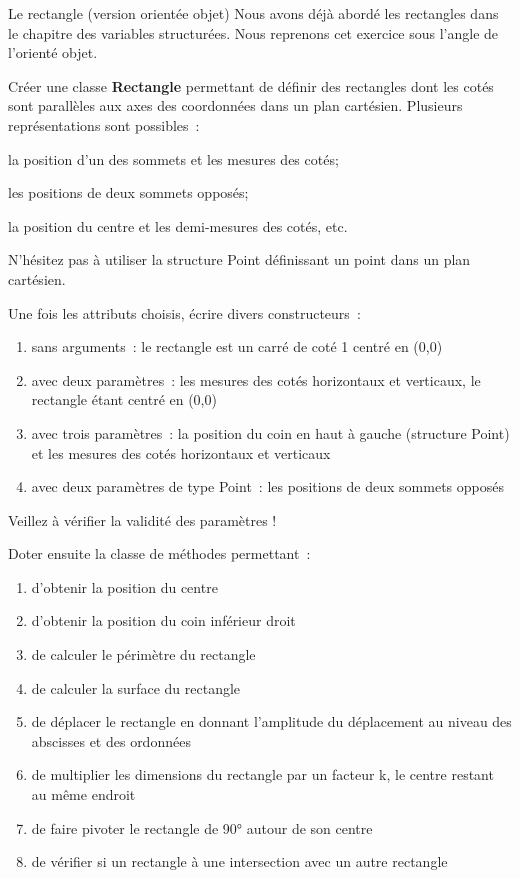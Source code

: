 \begin{Exercice}{Le rectangle (version orientée objet)}
	Nous avons déjà abordé les rectangles dans le chapitre des variables
	structurées. Nous reprenons cet exercice sous l’angle de l’orienté
	objet.

	Créer une classe \textbf{Rectangle}
	permettant de définir des rectangles dont les cotés sont parallèles aux
	axes des coordonnées dans un plan cartésien. Plusieurs représentations
	sont possibles~:

	\begin{liste}
		\item 
			la position d’un des sommets et les mesures des cotés;
		\item 
			les positions de deux sommets opposés;
		\item 
			la position du centre et les demi-mesures des cotés, etc.
	\end{liste}

	N’hésitez pas à utiliser la structure Point définissant un point dans un
	plan cartésien.

	Une fois les attributs choisis, écrire divers constructeurs~:

	\begin{enumerate}[label=\alph*)]
		\item 
			sans arguments~: le rectangle est un carré de coté 1 centré en (0,0)
		\item
			avec deux paramètres~: les mesures des cotés horizontaux et verticaux,
			le rectangle étant centré en (0,0)
		\item 
			avec trois paramètres~: la position du coin en haut à gauche (structure
			Point) et les mesures des cotés horizontaux et verticaux 
		\item 
			avec deux paramètres de type Point~: les positions de deux sommets
			opposés
	\end{enumerate}

	Veillez à vérifier la validité des paramètres !

	Doter ensuite la classe de méthodes permettant~:

	\begin{enumerate}[label=\alph*)]
		\item 
			d’obtenir la position du centre
		\item 
			d’obtenir la position du coin inférieur droit
		\item 
			de calculer le périmètre du rectangle
		\item 
			de calculer la surface du rectangle
		\item 
			de déplacer le rectangle en donnant l’amplitude du déplacement au niveau
			des abscisses et des ordonnées
		\item 
			de multiplier les dimensions du rectangle par un facteur k, le centre
			restant au même endroit
		\item 
			de faire pivoter le rectangle de 90° autour de son centre
		\item 
			de vérifier si un rectangle à une intersection avec un autre rectangle
	\end{enumerate}


\end{Exercice}
